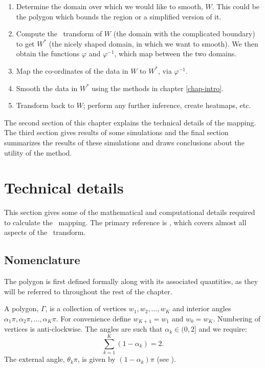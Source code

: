 \begin{enumerate}
\item Determine the domain over which we would like to smooth, $W$. This could be the polygon which bounds the region or a simplified version of it\label{cor-3s8-1}.
\item Compute the \sch\ transform of $W$ (the domain with the complicated boundary) to get $W^*$ (the nicely shaped domain, in which we want to smooth). We then obtain the functions $\varphi$ and $\varphi^{-1}$, which map between the two domains\label{cor-3s8-2}.
\item Map the co-ordinates of the data in $W$ to $W^*$, via $\varphi^{-1}$\label{cor-3s8-3}.
\item Smooth the data in $W^*$ using the methods in chapter \ref{chap-intro}.
\item Transform back to $W$; perform any further inference, create heatmaps, etc\label{cor-3s8-4}.
\end{enumerate}

The second section of this chapter explains the technical details of the mapping. The third section gives results of some simulations and the final section summarizes the results of these simulations and draws conclusions about the utility of the method.

\section{Technical details}

This section gives some of the mathematical and computational details required to calculate the \sch\ mapping. The primary reference is , which covers almost all aspects of the \sch\ transform.

\subsection{Nomenclature}
\label{sc-nomen}

The polygon is first defined formally along with its associated quantities, as they will be referred to throughout the rest of the chapter.

A polygon, $\Gamma$, is a collection of vertices $w_1, w_2,\ldots,w_K$ and interior angles $\alpha_1\pi, \alpha_2\pi, \ldots, \alpha_K\pi$. For convenience define $w_{K+1} = w_1$ and $w_0=w_K$. Numbering of vertices is anti-clockwise. The angles are such that $\alpha_k \in (0,2]$ and we require:
\begin{equation}
\sum_{k=1}^K (1-\alpha_k) = 2.
\end{equation}
The external angle, $\theta_k\pi$, is given by $(1-\alpha_k)\pi$ (see ). 

